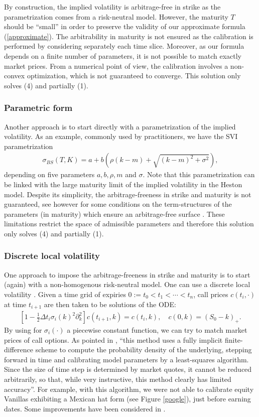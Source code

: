 \documentclass{amsart}%
\def\no{\noindent}
\theoremstyle{definition}
\theoremstyle{remark}
\newcommand{\beaa}{\begin{eqnarray*}}
\newcommand{\eeaa}{\end{eqnarray*}}
\begin{document}
\no By construction, the implied volatility is  arbitrage-free  in strike as the parametrization comes from a risk-neutral model. However, the maturity $T$ should be ``small'' in order to preserve the validity of our approximate formula (\ref{approximate}). The arbitrability in maturity is not ensured as the calibration is performed by considering separately each time slice. Moreover, as our formula depends on a finite number of parameters, it is not possible to match exactly market prices. From a numerical point of view, the calibration involves a non-convex optimization, which is not guaranteed to converge. This solution only solves (4) and partially (1).

\subsubsection{Parametric form}   Another approach is to start directly with a parametrization of the implied volatility. As an example, commonly used by practitioners, we have the SVI parametrization \cite{gatheral2014arbitrage}
\beaa \sigma_{BS}(T,K) =a +b \left( \rho(k-m)+\sqrt{(k-m)^2 +\sigma^2}  \right),\eeaa \no depending on five parameters $a,b,\rho,m$ and $\sigma$. Note that this parametrization can be linked with the large maturity limit of the implied volatility in the Heston model. Despite its simplicity, the arbitrage-freeness in strike and maturity is not guaranteed, see however  \cite{gatheral2011convergence} for some conditions on the term-structures of the parameters (in maturity) which ensure an arbitrage-free surface \cite{gatheral2014arbitrage}. These limitations restrict the space of admissible parameters and  therefore this solution only solves (4) and partially (1).

\subsubsection{Discrete local volatility} One approach to impose the arbitrage-freeness in strike and maturity is to start (again) with a non-homogenous risk-neutral model. One can use a discrete local volatility \cite{andreasen2013expanded}.  Given a time grid of expiries $0:=t_0<t_1<\cdots<t_n$, call prices $c(t_i,\cdot)$ at time $t_ {i+1}$ are then taken to be solutions of the ODE:
\beaa
\left[1-\frac{1 }{2}\Delta t_i \sigma_i(k)^2 \partial_k^2\right] c(t_{i+1},k)=c(t_i,k), \quad c(0,k)=(S_0-k)_+. \label{forwardPDE}
\eeaa
\no By using for $\sigma_i(\cdot)$ a piecewise constant function, we can try to match market prices of call options. As pointed in \cite{lipton2011filling}, ``this method uses a fully implicit finite-difference scheme to compute the probability density of the underlying, stepping forward in time
and calibrating model parameters by a least-squares algorithm. Since the size
of time step is determined by market quotes, it cannot be reduced arbitrarily, so
that, while very instructive, this method clearly has limited accuracy''.  For example, with this algorithm, we were not able   to calibrate equity Vanillas exhibiting a Mexican hat form (see Figure \ref{google}),  just before earning dates. Some improvements  have been considered in \cite{lipton2011filling}.
\end{document}
